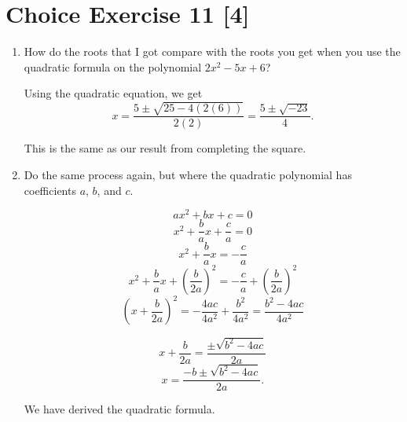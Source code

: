\documentclass{article}
\begin{document}
\section*{Choice Exercise 11 [4]}

\begin{enumerate}
    \item {
        How do the roots that I got compare with the roots you get when you use 
        the quadratic formula on the polynomial \(2x^2 -5x + 6\)?

        Using the quadratic equation, we get
        \[x = \frac{5 \pm \sqrt{25 - 4(2(6))}}{2(2)} = \frac{5 \pm \sqrt{-23}}{4}.\]

        This is the same as our result from completing the square.
    }

    \item {
        Do the same process again, but where the quadratic polynomial has coefficients 
        \(a\), \(b\), and  \(c\).

        \[ax^2 + bx + c = 0\]
        \[x^2 + \frac{b}{a}x + \frac{c}{a} = 0\]
        \[x^2 + \frac{b}{a}x = -\frac{c}{a}\]
        \[x^2 + \frac{b}{a}x + \left(\frac{b}{2a}\right)^2= -\frac{c}{a} + \left(\frac{b}{2a}\right)^2\]
        \[\left(x + \frac{b}{2a} \right)^2 = -\frac{4ac}{4a^2} + \frac{b^2}{4a^2} = \frac{b^2 - 4ac}{4a^2}\]
        
        \[x + \frac{b}{2a}  =  \frac{\pm \sqrt{b^2 - 4ac}}{2a}\]
        \[x =  \frac{-b \pm \sqrt{b^2 - 4ac}}{2a}.\]

        We have derived the quadratic formula.
    }
\end{enumerate}
\end{document}
